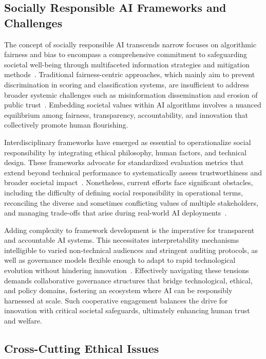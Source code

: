 \documentclass[sigconf]{acmart}
\begin{document}
\subsection{Socially Responsible AI Frameworks and Challenges}

The concept of socially responsible AI transcends narrow focuses on algorithmic fairness and bias to encompass a comprehensive commitment to safeguarding societal well-being through multifaceted information strategies and mitigation methods~\cite{ref26}. Traditional fairness-centric approaches, which mainly aim to prevent discrimination in scoring and classification systems, are insufficient to address broader systemic challenges such as misinformation dissemination and erosion of public trust~\cite{ref26}. Embedding societal values within AI algorithms involves a nuanced equilibrium among fairness, transparency, accountability, and innovation that collectively promote human flourishing.

Interdisciplinary frameworks have emerged as essential to operationalize social responsibility by integrating ethical philosophy, human factors, and technical design. These frameworks advocate for standardized evaluation metrics that extend beyond technical performance to systematically assess trustworthiness and broader societal impact~\cite{ref26}. Nonetheless, current efforts face significant obstacles, including the difficulty of defining social responsibility in operational terms, reconciling the diverse and sometimes conflicting values of multiple stakeholders, and managing trade-offs that arise during real-world AI deployments~\cite{ref26}.

Adding complexity to framework development is the imperative for transparent and accountable AI systems. This necessitates interpretability mechanisms intelligible to varied non-technical audiences and stringent auditing protocols, as well as governance models flexible enough to adapt to rapid technological evolution without hindering innovation~\cite{ref26}. Effectively navigating these tensions demands collaborative governance structures that bridge technological, ethical, and policy domains, fostering an ecosystem where AI can be responsibly harnessed at scale. Such cooperative engagement balances the drive for innovation with critical societal safeguards, ultimately enhancing human trust and welfare.

\subsection{Cross-Cutting Ethical Issues}
\end{document}
